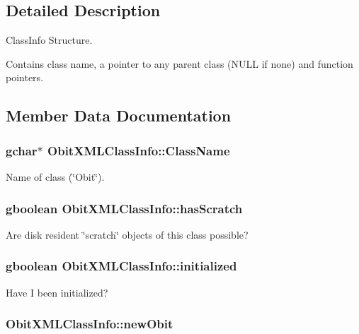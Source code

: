 \subsection{Detailed Description}
Class\-Info Structure. 

Contains class name, a pointer to any parent class (NULL if none) and function pointers. 



\subsection{Member Data Documentation}
\subsubsection{\setlength{\rightskip}{0pt plus 5cm}gchar$\ast$ {\bf Obit\-XMLClass\-Info::Class\-Name}}\label{structObitXMLClassInfo_o2}


Name of class (\char`\"{}Obit\char`\"{}). 

\subsubsection{\setlength{\rightskip}{0pt plus 5cm}gboolean {\bf Obit\-XMLClass\-Info::has\-Scratch}}\label{structObitXMLClassInfo_o1}


Are disk resident \char`\"{}scratch\char`\"{} objects of this class possible? 

\subsubsection{\setlength{\rightskip}{0pt plus 5cm}gboolean {\bf Obit\-XMLClass\-Info::initialized}}\label{structObitXMLClassInfo_o0}


Have I been initialized? 

\subsubsection{ {\bf Obit\-XMLClass\-Info::new\-Obit}}\label{structObitXMLClassInfo_o5}


